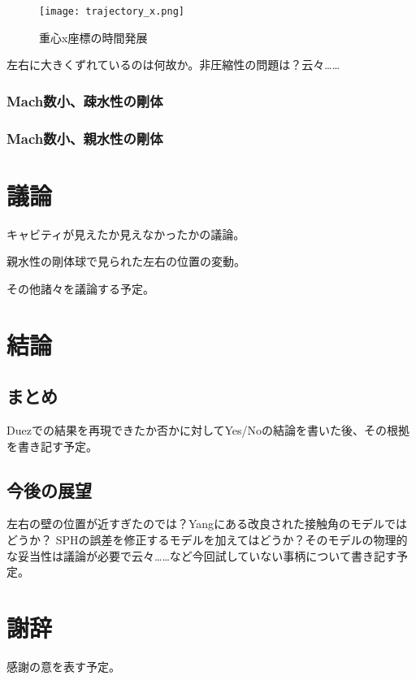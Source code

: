 \documentclass[]{jsarticle}
\begin{document}
\begin{figure}[H]
  \centering
  \texttt{[image: trajectory\_x.png]}
  \caption{重心x座標の時間発展}
  \label{fig:trajectory}
\end{figure}


左右に大きくずれているのは何故か。非圧縮性の問題は？云々……

\subsubsection{Mach数小、疎水性の剛体}
\subsubsection{Mach数小、親水性の剛体}
\newpage

\section{議論}

キャビティが見えたか見えなかったかの議論。

親水性の剛体球で見られた左右の位置の変動。

その他諸々を議論する予定。
\newpage
\section{結論}
\subsection{まとめ}
Duez\cite{Duez2007}での結果を再現できたか否かに対してYes/Noの結論を書いた後、その根拠を書き記す予定。
\subsection{今後の展望}
左右の壁の位置が近すぎたのでは？Yang\cite{Yang2017}にある改良された接触角のモデルではどうか？
SPHの誤差を修正するモデルを加えてはどうか？そのモデルの物理的な妥当性は議論が必要で云々……など今回試していない事柄について書き記す予定。
\newpage

\section{謝辞}
感謝の意を表す予定。
\newpage



\end{document}

